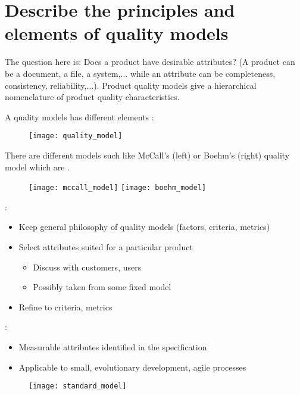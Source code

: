 \section{Describe the principles and elements of quality models}

The question here is: Does a product have desirable attributes? (A product can be a document, a file, a system,... while an attribute can be completeness, consistency, reliability,...). Product quality models give a hierarchical nomenclature of product quality characteristics.

A quality models has different elements :
\begin{figure}[H]
    \centering
    \texttt{[image: quality\_model]}
\end{figure}


There are different models such like McCall's (left) or Boehm's (right) quality model which are .
\begin{figure}[H]
    \centering
    \texttt{[image: mccall\_model]}\hfill
    \texttt{[image: boehm\_model]}
\end{figure}

\newpage
{} :
\begin{itemize}
    \item Keep general philosophy of quality models (factors, criteria, metrics)
    \item Select attributes suited for a particular product
    \begin{itemize}
        \item Discuss with customers, users
        \item Possibly taken from some fixed model
    \end{itemize}
    \item Refine to criteria, metrics
\end{itemize}

 :
\begin{itemize}
        \item Measurable attributes identified in the specification
        \item Applicable to small, evolutionary development, agile processes
\end{itemize}
\begin{figure}[H]
    \centering
    \texttt{[image: standard\_model]}
\end{figure}

